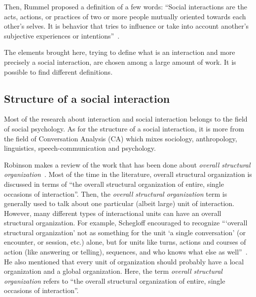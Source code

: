 \documentclass[a4paper,11pt,twoside]{StyleThese}
\begin{document}
Then, Rummel proposed a definition of a few words: ``Social interactions are the acts, actions, or practices of two or more people mutually oriented towards each other's selves. It is behavior that tries to influence or take into account another's subjective experiences or intentions''~\cite{rummel_1976_understanding}.

The elements brought here, trying to define what is an interaction and more precisely a social interaction, are chosen among a large amount of work. It is possible to find different definitions.

\subsection{Structure of a social interaction}\label{chap1:subsec:social_int}
Most of the research about interaction and social interaction belongs to the field of social psychology. As for the structure of a social interaction, it is more from the field of Conversation Analysis (CA) which mixes sociology, anthropology, linguistics, speech-communication and psychology.

Robinson makes a review of the work that has been done about \textit{overall structural organization}~\cite{robinson_overall_2012}. Most of the time in the literature, overall structural organization is discussed in terms of ``the overall structural organization of entire, single occasions of interaction''. Then, the \textit{overall structural organization} term is generally used to talk about one particular (albeit large) unit of interaction. However, many different types of interactional units can have an overall structural organization. For example, Schegloff encouraged to recognize ``‘overall structural organization’ not as something for the unit ‘a single conversation’ (or encounter, or session, etc.) alone, but for units like turns, actions and courses of action (like answering or telling), sequences, and who knows what else as well''~\cite{schegloff_2011_word}. He also mentioned that every unit of organization should probably have a local organization and a global organization. Here, the term \textit{overall structural organization} refers to ``the overall structural organization of entire, single occasions of interaction''. 
\end{document}
